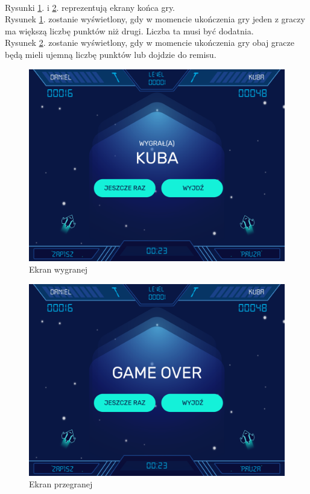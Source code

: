 \documentclass[a4paper]{article}
\begin{document}
\paragraph{}Rysunki \ref{fig:wygrana}. i \ref{fig:game over}. reprezentują ekrany końca gry.\\
Rysunek \ref{fig:wygrana}. zostanie wyświetlony, gdy w momencie ukończenia gry jeden z graczy ma większą liczbę punktów niż drugi. Liczba ta musi być dodatnia.\\
Rysunek \ref{fig:game over}. zostanie wyświetlony, gdy w momencie ukończenia gry obaj gracze będą mieli ujemną liczbę punktów lub dojdzie do remisu.
\begin{figure}[H]
    \centering
    \includegraphics[width=1\textwidth]{img/ekran-wygrana.png}
    \caption{Ekran wygranej}
    \label{fig:wygrana}
\end{figure}
\begin{figure}[H]
    \centering
    \includegraphics[width=1\textwidth]{img/ekran-game-over.png}
    \caption{Ekran przegranej}
    \label{fig:game over}
\end{figure}
\end{document}
